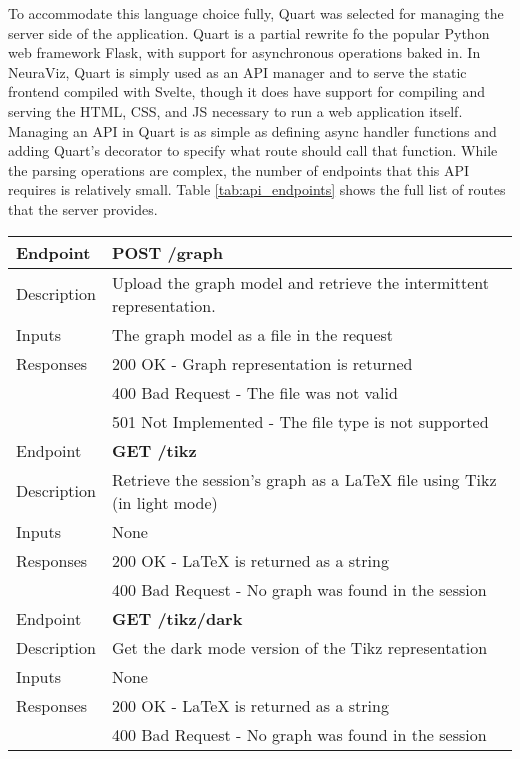 To accommodate this language choice fully, Quart \cite{quart} was selected for managing the server side of the application. Quart is a partial rewrite fo the popular Python web framework Flask, with support for asynchronous operations baked in. In NeuraViz, Quart is simply used as an API manager and to serve the static frontend compiled with Svelte, though it does have support for compiling and serving the HTML, CSS, and JS necessary to run a web application itself. Managing an API in Quart is as simple as defining async handler functions and adding Quart's decorator to specify what route should call that function. While the parsing operations are complex, the number of endpoints that this API requires is relatively small. Table \ref{tab:api_endpoints} shows the full list of routes that the server provides.

\begin{center}
    \begin{tabular}{|l|l|}
        \hline
        \rowcolor{gray!40} Endpoint & \textbf{POST /graph} \\
        \hline
        Description & Upload the graph model and retrieve the intermittent representation. \\
        \hline
        Inputs & The graph model as a file in the request \\
        \hline
        Responses & 200 OK - Graph representation is returned \\
        & 400 Bad Request - The file was not valid \\
        & 501 Not Implemented - The file type is not supported \\
        \hline
        \rowcolor{gray!40} Endpoint & \textbf{GET /tikz}\\
        \hline
        Description & Retrieve the session's graph as a LaTeX file using Tikz (in light mode) \\
        \hline
        Inputs & None \\
        \hline
        Responses & 200 OK - LaTeX is returned as a string \\
        & 400 Bad Request - No graph was found in the session \\
        \hline
        \rowcolor{gray!40} Endpoint & \textbf{GET /tikz/dark} \\
        \hline 
        Description & Get the dark mode version of the Tikz representation \\
        \hline
        Inputs & None \\
        \hline
        Responses & 200 OK - LaTeX is returned as a string \\
        & 400 Bad Request - No graph was found in the session \\
        \hline
    \end{tabular}
    \label{tab:api_endpoints}
\end{center}


